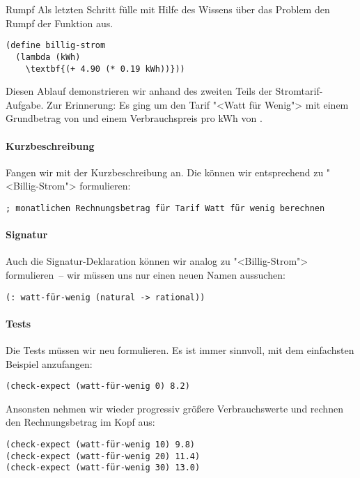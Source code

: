\begin{konstruktionsanleitung}{Rumpf}
  \label{ka:rumpf}
  Als letzten Schritt fülle mit Hilfe des Wissens über das Problem
  den Rumpf der Funktion aus.
\begin{lstlisting}
(define billig-strom
  (lambda (kWh)
    \textbf{(+ 4.90 (* 0.19 kWh))}))
\end{lstlisting}
\end{konstruktionsanleitung}

Diesen Ablauf demonstrieren wir anhand des zweiten Teils der
Stromtarif-Aufgabe.
Zur Erinnerung:  Es ging um den Tarif
"<Watt für Wenig"> mit einem Grundbetrag von  und einem
Verbrauchspreis pro kWh von .

\paragraph{Kurzbeschreibung}

Fangen wir mit der Kurzbeschreibung an.  Die können wir entsprechend
zu "<Billig-Strom"> formulieren:
\begin{lstlisting}
; monatlichen Rechnungsbetrag für Tarif Watt für wenig berechnen
\end{lstlisting}

\paragraph{Signatur}

Auch die Signatur-Deklaration können wir analog zu "<Billig-Strom">
formulieren~-- wir müssen uns nur einen neuen Namen aussuchen:
%
\begin{lstlisting}
(: watt-für-wenig (natural -> rational))
\end{lstlisting}

\paragraph{Tests}

Die Tests müssen wir neu formulieren.  Es ist immer sinnvoll, mit dem
einfachsten Beispiel anzufangen:
\begin{lstlisting}
(check-expect (watt-für-wenig 0) 8.2)
\end{lstlisting}

Ansonsten nehmen wir wieder progressiv größere Verbrauchswerte und
rechnen den Rechnungsbetrag im Kopf aus:
%
\begin{lstlisting}
(check-expect (watt-für-wenig 10) 9.8)
(check-expect (watt-für-wenig 20) 11.4)
(check-expect (watt-für-wenig 30) 13.0)
\end{lstlisting}

